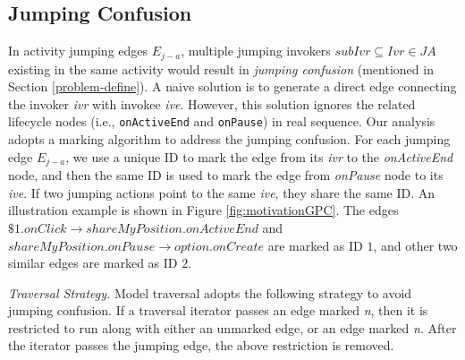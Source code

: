 \subsection{Jumping Confusion}\label{jumpConfusion}
In activity jumping edges $E_{j-a}$, multiple jumping invokers $subIvr\subseteq Ivr\in JA$  existing in the same activity would result in \textit{jumping confusion} (mentioned in Section \ref{problem-define}). A naive solution is to generate a direct edge connecting the invoker \textit{ivr} with invokee \textit{ive}. However, this solution ignores the related lifecycle nodes (i.e., \texttt{onActiveEnd} and \texttt{onPause}) in real sequence. Our analysis adopts a marking algorithm to address the jumping confusion. For each jumping edge $E_{j-a}$, we use a unique ID to mark the edge from its \textit{ivr} to the \textit{onActiveEnd} node, and then the same ID is used to mark the edge from \textit{onPause} node to its \textit{ive}. If two jumping actions point to the same \textit{ive}, they share the same ID. An illustration example is shown in Figure \ref{fig:motivationGPC}. The edges $\$1.onClick\rightarrow shareMyPosition.onActiveEnd$ and $shareMyPosition.onPause\rightarrow option.onCreate$ are marked as ID $1$, and other two similar edges are marked as ID $2$.

\textit{Traversal Strategy.} 
Model traversal adopts the following strategy to avoid jumping confusion. If a traversal iterator passes an edge marked \textit{n}, then it is restricted to run along with either an unmarked edge, or an edge marked \textit{n}. After the iterator passes the jumping edge, the above restriction is removed.

